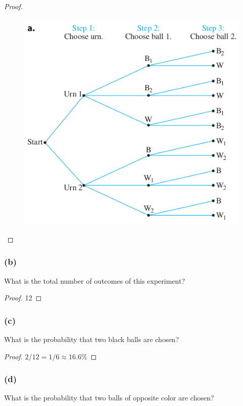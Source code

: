 \documentclass[14pt]{extarticle}
\begin{document}
\begin{proof}
\begin{figure}[ht!]
\centering
\includegraphics[scale=0.5]{../images/9.2.6.a.png}
\end{figure}
\end{proof}

\subsubsection{(b)}
What is the total number of outcomes of this experiment?

\begin{proof}
12
\end{proof}

\subsubsection{(c)}
What is the probability that two black balls are chosen?

\begin{proof}
\(2/12 = 1/6 \approx 16.6\%\)
\end{proof}

\subsubsection{(d)}
What is the probability that two balls of opposite color are chosen?
\end{document}
